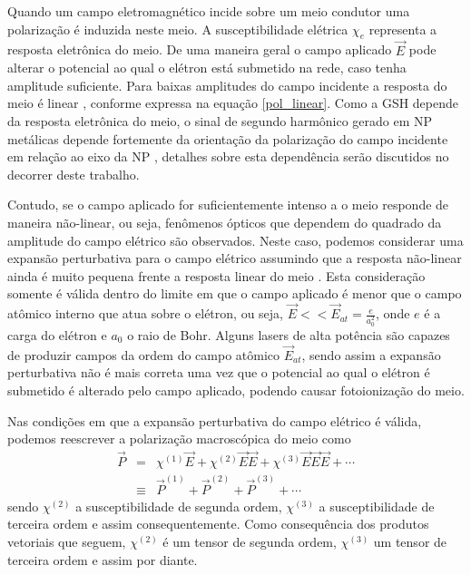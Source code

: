 Quando um campo eletromagnético incide sobre um meio condutor uma polarização é induzida neste meio. A susceptibilidade elétrica $\chi_e$ representa a resposta eletrônica do meio. De uma maneira geral o campo aplicado $\vec{E}$ pode alterar o potencial ao qual o elétron está submetido na rede, caso tenha amplitude suficiente. Para baixas amplitudes do campo incidente a resposta do meio é linear , conforme expressa na equação \ref{pol_linear}. Como a GSH depende da resposta eletrônica do meio, o sinal de segundo harmônico gerado em NP metálicas depende fortemente da orientação da polarização do campo incidente em relação ao eixo da NP \cite{zayats,principle,bouhelier,novotny,takahashi}, detalhes sobre esta dependência serão discutidos no decorrer deste trabalho. 

Contudo, se o campo aplicado for suficientemente intenso a o meio responde de maneira não-linear, ou seja, fenômenos ópticos que dependem do quadrado da amplitude do campo elétrico são observados. Neste caso, podemos considerar uma expansão perturbativa para o campo elétrico assumindo que a resposta não-linear ainda é muito pequena frente a resposta linear do meio \cite{boyd}. Esta consideração somente é válida dentro do limite em que o campo aplicado é menor que o campo atômico interno que atua sobre o elétron, ou seja, $\vec{E} << \vec{E}_{at}=\frac{e}{a_0^2}$, onde $e$ é a carga do elétron e $a_0$ o raio de Bohr. Alguns lasers de alta potência são capazes de produzir campos da ordem do campo atômico $\vec{E}_{at}$, sendo assim a expansão perturbativa não é mais correta uma vez que o potencial ao qual o elétron é submetido é alterado pelo campo aplicado, podendo causar fotoionização do meio.

Nas condições em que a expansão perturbativa do campo elétrico é válida, podemos reescrever a polarização macroscópica do meio como
\begin{eqnarray}
 \vec{P}&=&\chi^{(1)}\vec{E}+\chi^{(2)}\vec{E}\vec{E}+\chi^{(3)}\vec{E}\vec{E}\vec{E}+\cdots \nonumber \\
 &\equiv&\vec{P}^{(1)}+\vec{P}^{(2)}+\vec{P}^{(3)}+\cdots
\label{expansao_nl}
\end{eqnarray}
sendo $\chi^{(2)}$ a susceptibilidade de segunda ordem, $\chi^{(3)}$ a susceptibilidade de terceira ordem e assim consequentemente. Como consequência dos produtos vetoriais que seguem, $\chi^{(2)}$ é um tensor de segunda ordem, $\chi^{(3)}$ um tensor de terceira ordem e assim por diante.

